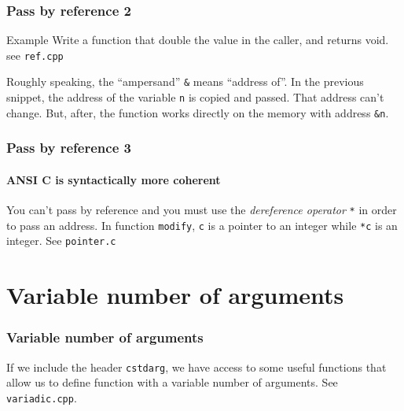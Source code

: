 \documentclass[12pt]{beamer}
\begin{document}
\begin{frame}
\frametitle{Pass by reference 2}

\begin{block}{Example}
Write a function that double the value in the caller,
and returns void. see \lstinline/ref.cpp/
\end{block}

    Roughly speaking, the ``ampersand'' \lstinline/&/ means ``address of''.
    In the previous snippet, the address of the variable \lstinline/n/ is copied and passed. That address can't change.
    But, after, the function works directly on the memory with address \lstinline/&n/.
\end{frame}

\begin{frame}
\frametitle{Pass by reference 3}
\framesubtitle{ANSI C is syntactically more coherent}
    You can't pass by reference and you must use the \textit{dereference operator} \lstinline/*/ in order to pass an address.
    \AnsiCPoint
    In function \lstinline/modify/, \lstinline/c/ is a pointer to an integer while \lstinline/*c/ is an integer.
    See \lstinline/pointer.c/
\end{frame}



\section{Variable number of arguments}

\begin{frame}
\frametitle{Variable number of arguments}
If we include the header \lstinline/cstdarg/, we have access to some useful functions that allow us to
define function with a variable number of arguments. See \lstinline/variadic.cpp/.


\VaList


\end{frame}
\end{document}

